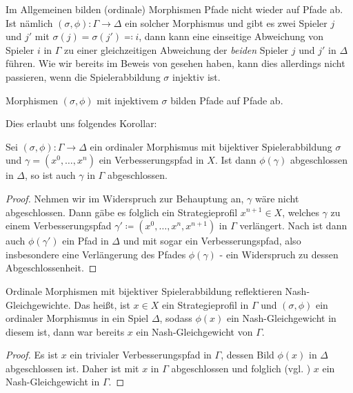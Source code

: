 Im Allgemeinen bilden (ordinale) Morphismen Pfade nicht wieder auf Pfade ab. Ist nämlich $(\sigma, \phi): \Gamma \to \Delta$ ein solcher Morphismus und gibt es zwei Spieler $j$ und $j'$ mit $\sigma(j) = \sigma(j') \eqqcolon i$, dann kann eine einseitige Abweichung von Spieler $i$ in $\Gamma$ zu einer gleichzeitigen Abweichung der \emph{beiden} Spieler $j$ und $j'$ in $\Delta$ führen. Wie wir bereits im Beweis von  gesehen haben, kann dies allerdings nicht passieren, wenn die Spielerabbildung $\sigma$ injektiv ist.

\begin{beob}\label{beob:PfadeAufPfade}
	Morphismen $(\sigma, \phi)$ mit injektivem $\sigma$ bilden Pfade auf Pfade ab.
\end{beob}

Dies erlaubt uns folgendes Korollar:

\begin{kor}\label{kor:ReflAbg}
	Sei $(\sigma, \phi): \Gamma \to \Delta$ ein ordinaler Morphismus mit bijektiver Spielerabbildung $\sigma$ und $\gamma = (x^0, \dots, x^n)$ ein Verbesserungspfad in $X$. Ist dann $\phi(\gamma)$ abgeschlossen in $\Delta$, so ist auch $\gamma$ in $\Gamma$ abgeschlossen.
\end{kor}
	
\begin{proof}	
	Nehmen wir im Widerspruch zur Behauptung an, $\gamma$ wäre nicht abgeschlossen. Dann gäbe es folglich ein Strategieprofil $x^{n+1} \in X$, welches $\gamma$ zu einem Verbesserungspfad $\gamma' \coloneqq (x^0, \dots, x^n, x^{n+1})$ in $\Gamma$ verlängert. Nach  ist dann auch $\phi(\gamma')$ ein Pfad in $\Delta$ und mit  sogar ein Verbesserungspfad, also insbesondere eine Verlängerung des Pfades $\phi(\gamma)$ - ein Widerspruch zu dessen Abgeschlossenheit.
\end{proof}

\begin{kor}\label{kor:ReflektNG}
	Ordinale Morphismen mit bijektiver Spielerabbildung reflektieren Nash-Gleichgewichte. Das heißt, ist $x \in X$ ein Strategieprofil in $\Gamma$ und $(\sigma, \phi)$ ein ordinaler Morphismus in ein Spiel $\Delta$, sodass $\phi(x)$ ein Nash-Gleichgewicht in diesem ist, dann war bereits $x$ ein Nash-Gleichgewicht von $\Gamma$.
\end{kor}

\begin{proof}
	Es ist $x$ ein trivialer Verbesserungspfad in $\Gamma$, dessen Bild $\phi(x)$ in $\Delta$ abgeschlossen ist. Daher ist mit  $x$ in $\Gamma$ abgeschlossen und folglich (vgl. ) $x$ ein Nash-Gleichgewicht in $\Gamma$.
\end{proof}

